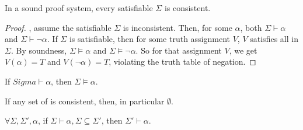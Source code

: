 \begin{theorem}
In a sound proof system, every satisfiable $\Sigma$ is consistent. 
\end{theorem}

\begin{proof}
\bwoc, assume the satisfiable $\Sigma$ is inconsistent. Then, for some $\alpha$, both $\Sigma\vdash\alpha$ and $\Sigma\vdash\neg\alpha$. 
If $\Sigma$ is satisfiable, then for some truth assignment $V$, $V$ satisfies all \wff in $\Sigma$. By soundness, $\Sigma\models\alpha$ and $\Sigma\models\neg\alpha$. So for that assignment $V$, we get $V(\alpha)=T$ and $V(\neg\alpha)=T$, violating the truth table of negation.
\end{proof}

\begin{theorem}
If $Sigma\vdash\alpha$, then $\Sigma\models\alpha$.
\end{theorem}

\begin{corollary}
If any set of \wff is consistent, then, in particular $\emptyset$.
\end{corollary}

\begin{definition}[Monotonicity]
  $\forall \Sigma, \Sigma', \alpha$, if $\Sigma\vdash\alpha, \Sigma\subseteq\Sigma'$, then $\Sigma'\vdash\alpha$.
\end{definition}